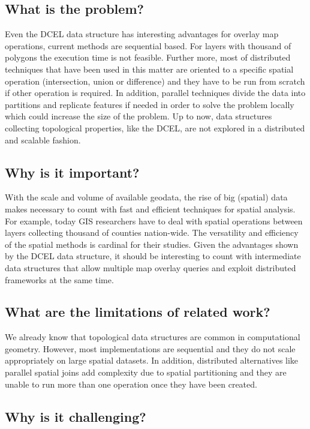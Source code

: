 \subsection{What is the problem?}
Even the DCEL data structure has interesting advantages for overlay map operations, current methods are sequential based.  For layers with thousand of polygons the execution time is not feasible.  Further more, most of distributed techniques that have been used in this matter are oriented to a specific spatial operation (intersection, union or difference) and they have to be run from scratch if other operation is required.  In addition, parallel techniques divide the data into partitions and replicate features if needed in order to solve the problem locally which could increase the size of the problem.  Up to now, data structures collecting topological properties, like the DCEL, are not explored in a distributed and scalable fashion.

\subsection{Why is it important?}
With the scale and volume of available geodata, the rise of big (spatial) data makes necessary to count with fast and efficient techniques for spatial analysis.  For example, today GIS researchers have to deal with spatial operations between layers collecting thousand of counties nation-wide.  The versatility and efficiency of the spatial methods is cardinal for their studies. Given the advantages shown by the DCEL data structure, it should be interesting to count with intermediate data structures that allow multiple map overlay queries and exploit distributed frameworks at the same time. 

\subsection{What are the limitations of related work?}
We already know that topological data structures are common in computational geometry.  However, most implementations are sequential and they do not scale appropriately on large spatial datasets.  In addition, distributed alternatives like parallel spatial joins add complexity due to spatial partitioning and they are unable to run more than one operation once they have been created.

\subsection{Why is it challenging?}

